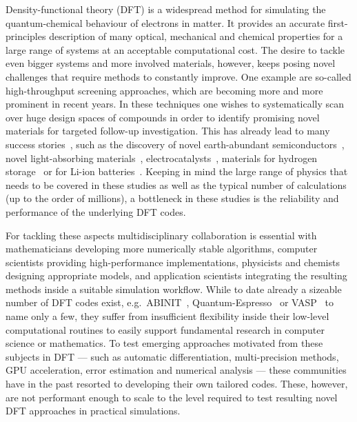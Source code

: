 \documentclass{juliacon}
\begin{document}


\maketitle

Density-functional theory (DFT) is a widespread method for simulating the
quantum-chemical behaviour of electrons in matter.
It provides an accurate first-principles description of
many optical, mechanical and chemical properties
for a large range of systems at an acceptable computational cost.
The desire to tackle even bigger systems and
more involved materials, however, keeps posing novel challenges
that require methods to constantly improve.
One example are so-called high-throughput screening approaches,
which are becoming more and more prominent in recent years.
In these techniques one
wishes to systematically scan over huge design spaces of compounds
in order to identify promising novel materials
for targeted follow-up investigation.
This has already lead to many success stories~\cite{Jain2016},
such as the discovery of
novel earth-abundant semiconductors~\cite{Hinuma2016},
novel light-absorbing materials~\cite{Zhao2017},
electrocatalysts~\cite{Greeley2006},
materials for hydrogen storage~\cite{Hummelshoj2009}
or for Li-ion batteries~\cite{Ahmad2018}.
Keeping in mind the large range of physics that needs
to be covered in these studies as well as
the typical  number of calculations (up to the order of millions),
a bottleneck in these studies
is the reliability and performance
of the underlying DFT codes.
\vskip 6pt

For tackling these aspects
multidisciplinary collaboration is essential with
mathematicians developing more numerically stable algorithms,
computer scientists providing high-performance implementations,
physicists and chemists designing appropriate models,
and application scientists integrating the resulting methods
inside a suitable simulation workflow.
While to date already a sizeable number of DFT codes exist,
e.g.~ABINIT~\cite{Romero2020}, Quantum-Espresso~\cite{Giannozzi2020}
or VASP~\cite{VASP} to name only a few,
they suffer from insufficient flexibility inside
their low-level computational routines
to easily support fundamental research
in computer science or mathematics.
To test emerging approaches motivated from these subjects in DFT
---
such as automatic differentiation, multi-precision methods,
GPU acceleration, error estimation and numerical analysis
---
these communities have in the past resorted
to developing their own tailored codes.
These, however, are not performant enough
to scale to the level required to test
resulting novel DFT approaches in practical simulations.
\vskip 6pt
\end{document}
